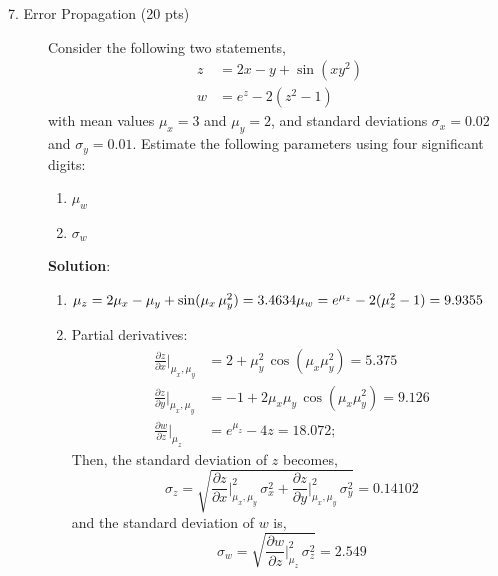 \documentclass[12pt]{article}
\begin{document}
\begin{description}
\item[7. Error Propagation (20 pts)] Consider the following two statements,
\begin{align*}
    z &= 2 x - y + \sin(x y^2) \\
    w &= e^z - 2 (z^2 - 1)
\end{align*}
with mean values $\mu_x = 3$ and $\mu_y = 2$, and standard deviations $\sigma_x = 0.02$ and $\sigma_y = 0.01$. Estimate the following parameters using four significant digits: 
	\begin{enumerate}[label=\textbf{(\alph*)}]
	\item $\mu_w$
	\item $\sigma_w$
	\end{enumerate}

    \color{red}
    \ifsolution
    {\bf Solution}:\\
    \begin{enumerate}[label=\textbf{(\alph*)}]
    
    \item $\mu_z = 2 \mu_x - \mu_y + \sin(\mu_x \, \mu_y^2) = 3.4634\\
    \mu_w = e^{\mu_z} - 2 (\mu_z^2 - 1) = 9.9355$
    
    \item Partial derivatives:
    \begin{align*}
       \frac{\partial z}{\partial x}\Bigr\rvert_{\mu_x,\mu_y} &= 2 + \mu_y^2 \, \cos(\mu_x \mu_y^2) = 5.375 \\
       \frac{\partial z}{\partial y}\Bigr\rvert_{\mu_x,\mu_y} &= -1 + 2\mu_x \mu_y \, \cos(\mu_x \mu_y^2) = 9.126 \\
       \frac{\partial w}{\partial z}\Bigr\rvert_{\mu_z} &= e^{\mu_z} - 4z = 18.072;
    \end{align*}
    Then, the standard deviation of $z$ becomes,
        \begin{equation*}
       \sigma_z = \sqrt{\frac{\partial z}{\partial x}\Bigr\rvert_{\mu_x,\mu_y}^2 \, \sigma_x^2 + \frac{\partial z}{\partial y}\Bigr\rvert_{\mu_x,\mu_y}^2 \, \sigma_y^2} = 0.14102
    \end{equation*}
    and the standard deviation of $w$ is,
        \begin{equation*}
       \sigma_w = \sqrt{\frac{\partial w}{\partial z}\Bigr\rvert_{\mu_z}^2 \, \sigma_z^2} = 2.549
    \end{equation*}
    
    \end{enumerate}
    \fi
    \color{black}
\end{description}
\end{document}

